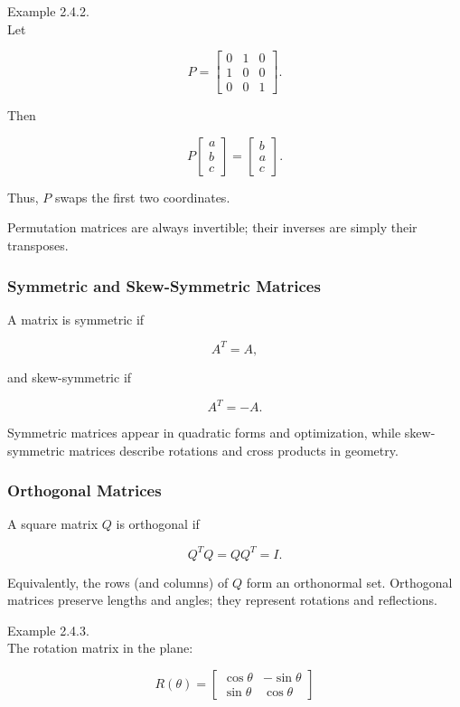 \documentclass[
  12pt,
  a4paper,
]{article}
\begin{document}
Example 2.4.2.\\
Let

\[P = \begin{bmatrix}
0 & 1 & 0 \\
1 & 0 & 0 \\
0 & 0 & 1
\end{bmatrix}.\]

Then

\[P\begin{bmatrix} a \\ b \\ c \end{bmatrix} =
\begin{bmatrix} b \\ a \\ c \end{bmatrix}.\]

Thus, \(P\) swaps the first two coordinates.

Permutation matrices are always invertible; their inverses are simply
their transposes.

\subsubsection{Symmetric and Skew-Symmetric
Matrices}\label{symmetric-and-skew-symmetric-matrices}

A matrix is symmetric if

\[A^T = A,\]

and skew-symmetric if

\[A^T = -A.\]

Symmetric matrices appear in quadratic forms and optimization, while
skew-symmetric matrices describe rotations and cross products in
geometry.

\subsubsection{Orthogonal Matrices}\label{orthogonal-matrices}

A square matrix \(Q\) is orthogonal if

\[Q^T Q = QQ^T = I.\]

Equivalently, the rows (and columns) of \(Q\) form an orthonormal set.
Orthogonal matrices preserve lengths and angles; they represent
rotations and reflections.

Example 2.4.3.\\
The rotation matrix in the plane:

\[R(\theta) = \begin{bmatrix}
\cos\theta & -\sin\theta \\
\sin\theta & \cos\theta
\end{bmatrix}\]
\end{document}
